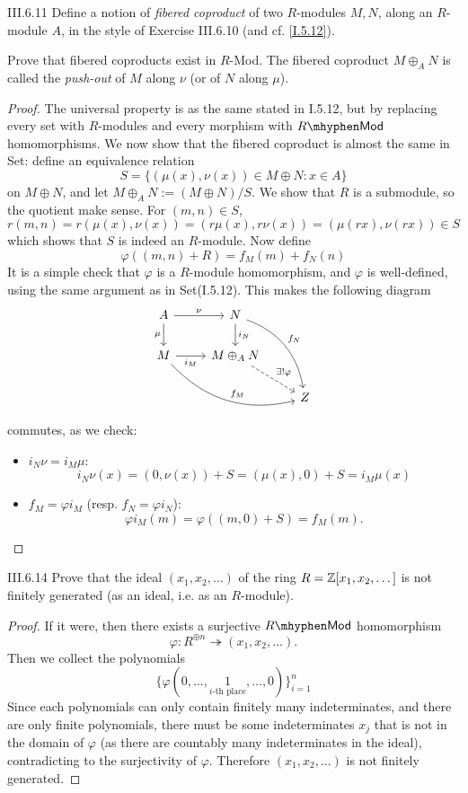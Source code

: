\begin{problem}{III.6.11}
Define a notion of \emph{fibered coproduct} of two $R$-modules $M, N$, along an $R$-module $A$, in the style of Exercise III.6.10 (and cf. \ref{I.5.12}).

Prove that fibered coproducts exist in $R$-\textsf{Mod}. The fibered coproduct $M \oplus_A N$ is called the \emph{push-out} of $M$ along $\nu$ (or of $N$ along $\mu$).
\end{problem}
\begin{proof}
The universal property is as the same stated in I.5.12, but by replacing every set with $R$-modules and every morphism with $R\mhyphen\mathsf{Mod}$ homomorphisms. We now show that the fibered coproduct is almost the same in \textsf{Set}: define an equivalence relation
\[
S = \{(\mu(x), \nu(x)) \in M \oplus N : x \in A\}
\]
on $M \oplus N$, and let $M \oplus_A N := (M \oplus N)/S$. We show that $R$ is a submodule, so the quotient make sense. For $(m,n) \in S$,
\[
r(m,n) = r(\mu(x),\nu(x)) = (r\mu(x), r\nu(x)) = (\mu(rx), \nu(rx)) \in S
\]
which shows that $S$ is indeed an $R$-module. Now define
\[
\varphi((m,n)+R) = f_M(m) + f_N(n)
\]
It is a simple check that $\varphi$ is a $R$-module homomorphism, and $\varphi$ is well-defined, using the same argument as in \textsf{Set}(I.5.12). This makes the following diagram
\[
\begin{tikzcd}
A \arrow[r, "\nu"] \arrow[d, "\mu"']       & N \arrow[d, "i_N"] \arrow[rdd, "f_N", bend left]          &   \\
M \arrow[r, "i_M"'] \arrow[rrd, "f_M", bend right] & M \oplus_A N \arrow[rd, "\exists!\varphi", dashed] &   \\
&                                                    & Z
\end{tikzcd}
\]
commutes, as we check:
\begin{itemize}
\item $i_N \nu = i_M \mu$:
\[
i_N \nu (x) = (0, \nu(x)) + S = (\mu(x), 0) + S = i_M \mu(x)
\]
\item $f_M = \varphi i_M $ (resp. $f_N = \varphi i_N$):
\[
\varphi	i_M (m) = \varphi((m,0)+S) = f_M(m).
\]
\end{itemize}
\end{proof}



\begin{problem}{III.6.14}
Prove that the ideal $(x_1,x_2,\dotsc)$ of the ring $R = \mathbb{Z}[x_1,x_2,\dotsc]$ is not finitely generated (as an ideal, i.e. as an $R$-module).
\end{problem}
\begin{proof}
If it were, then there exists a surjective $R\mhyphen\mathsf{Mod}$ homomorphism
\[
\varphi : R^{\oplus n} \twoheadrightarrow (x_1,x_2,\dotsc).
\]
Then we collect the polynomials
\[
\{\varphi(0,\dotsc,\underset{i\text{-th place}}{1},\dotsc,0)\}_{i = 1}^n
\]
Since each polynomials can only contain finitely many indeterminates, and there are only finite polynomials, there must be some indeterminates $x_j$ that is not in the domain of $\varphi$ (as there are countably many indeterminates in the ideal), contradicting to the surjectivity of $\varphi$. Therefore $(x_1,x_2,\dotsc)$ is not finitely generated.
\end{proof}

